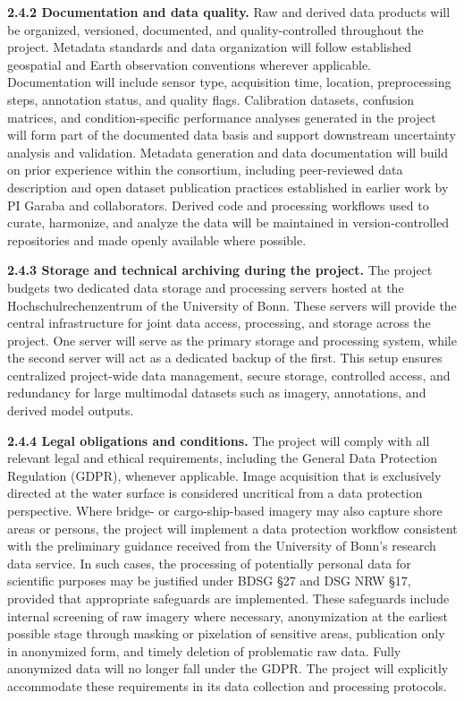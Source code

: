 \documentclass{scrartcl}
\begin{document}
\textbf{2.4.2 Documentation and data quality.} Raw and derived data products will be organized, versioned, documented, and quality-controlled throughout the project. Metadata standards and data organization will follow established geospatial and Earth observation conventions wherever applicable. Documentation will include sensor type, acquisition time, location, preprocessing steps, annotation status, and quality flags. Calibration datasets, confusion matrices, and condition-specific performance analyses generated in the project will form part of the documented data basis and support downstream uncertainty analysis and validation. Metadata generation and data documentation will build on prior experience within the consortium, including peer-reviewed data description and open dataset publication practices established in earlier work by PI Garaba and collaborators. Derived code and processing workflows used to curate, harmonize, and analyze the data will be maintained in version-controlled repositories and made openly available where possible.

\textbf{2.4.3 Storage and technical archiving during the project.} The project budgets two dedicated data storage and processing servers hosted at the Hochschulrechenzentrum of the University of Bonn. These servers will provide the central infrastructure for joint data access, processing, and storage across the project. One server will serve as the primary storage and processing system, while the second server will act as a dedicated backup of the first. This setup ensures centralized project-wide data management, secure storage, controlled access, and redundancy for large multimodal datasets such as imagery, annotations, and derived model outputs.

\textbf{2.4.4 Legal obligations and conditions.} The project will comply with all relevant legal and ethical requirements, including the General Data Protection Regulation (GDPR), whenever applicable. Image acquisition that is exclusively directed at the water surface is considered uncritical from a data protection perspective. Where bridge- or cargo-ship-based imagery may also capture shore areas or persons, the project will implement a data protection workflow consistent with the preliminary guidance received from the University of Bonn's research data service. In such cases, the processing of potentially personal data for scientific purposes may be justified under BDSG \S27 and DSG NRW \S17, provided that appropriate safeguards are implemented. These safeguards include internal screening of raw imagery where necessary, anonymization at the earliest possible stage through masking or pixelation of sensitive areas, publication only in anonymized form, and timely deletion of problematic raw data. Fully anonymized data will no longer fall under the GDPR. The project will explicitly accommodate these requirements in its data collection and processing protocols.
\end{document}
